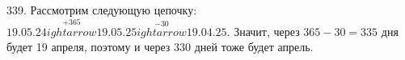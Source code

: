 339. Рассмотрим следующую цепочку: $19.05.24\stackrel{+365}{
ightarrow}19.05.25\stackrel{-30}{
ightarrow}19.04.25.$ Значит, через $365-30=335$ дня будет 19 апреля, поэтому и через 330 дней тоже будет апрель.\\
